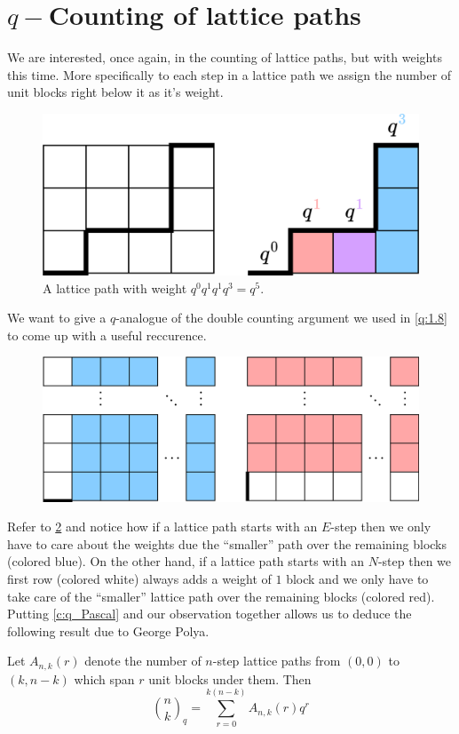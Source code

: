 \section{\texorpdfstring{$q-$}-Counting of lattice paths}
We are interested, once again, in the counting of lattice paths, but with weights this time. More specifically to each step in a lattice path we assign the number of unit blocks right below it as it's weight. 
\begin{figure}[H]
    \centering
    \includegraphics[width=0.65\linewidth]{Images/Figure27.png}
    \caption{A lattice path with weight $q^0q^1q^1q^3=q^5$.}
    \label{f:F2L}
\end{figure}
We want to give a $q$-analogue of the double counting argument we used in \cref{q:1.8} to come up with a useful reccurence. 
\begin{figure}[H]
    \centering
    \includegraphics[width=0.65\linewidth]{Images/Figure28.png}
    \caption{}
    \label{fig:Cayley_Rec}
\end{figure}
Refer to \cref{fig:Cayley_Rec} and notice how if a lattice path starts with an $E$-step then we only have to care about the weights due the ``smaller'' path over the remaining blocks (colored blue). On the other hand, if a lattice path starts with an $N$-step then we first row (colored white) always adds a weight of $1$ block and we only have to take care of the ``smaller'' lattice path over the remaining blocks (colored red). Putting \cref{c:q_Pascal} and our observation together allows us to deduce the following result due to George Polya.
\begin{theorem}
Let $A_{n,k}(r)$ denote the number of $n$-step lattice paths from $(0,0)$ to $(k,n-k)$ which span $r$ unit blocks under them. Then 
\[
\binom{n}{k}_q = \sum_{r=0}^{k(n-k)}A_{n,k}(r)q^r
\]
\end{theorem}
